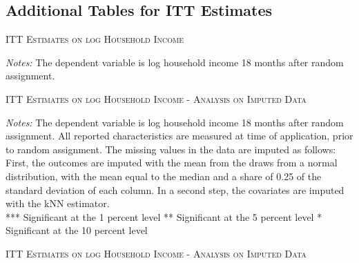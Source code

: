 \begin{appendices}
\newpage
\subsection*{Additional Tables for ITT Estimates} \label{appendix_itt_estimates}
\begin{table}[H]
\centering
\caption{\textsc{ITT Estimates on log Household Income}}
\addtolength{\tabcolsep}{24pt}

\addtolength{\tabcolsep}{-24pt}

\medskip


\label{tab:table_complete_nocontr}
\bigskip
\raggedright
\footnotesize
\textit{Notes:} The dependent variable is log household income 18 months after random assignment. \\
\end{table}

\begin{table}[t!]
\centering
\caption{\textsc{ITT Estimates on log Household Income - Analysis on Imputed Data}}



\medskip
\begin{adjustbox}{width=0.825\textwidth, totalheight=\textheight, keepaspectratio}

\end{adjustbox}

\label{tab:table_kNN_msd_withcontr}
\bigskip
\raggedright
\footnotesize
\textit{Notes:} The dependent variable is log household income 18 months after random assignment. All reported characteristics are measured at time of application, prior to random assignment. The missing values in the data are imputed as follows: First, the outcomes are imputed with the mean from the draws from a normal distribution, with the mean equal to the median and a share of 0.25 of the standard deviation of each column. In a second step, the covariates are imputed with the \ac{kNN} estimator. \\
*** Significant at the 1 percent level ** Significant at the 5 percent level * Significant at the 10 percent level
\end{table}

\newpage
\begin{table}[t!]
\centering
\caption{\textsc{ITT Estimates on log Household Income - Analysis on Imputed Data}}




\end{table}
\end{appendices}
